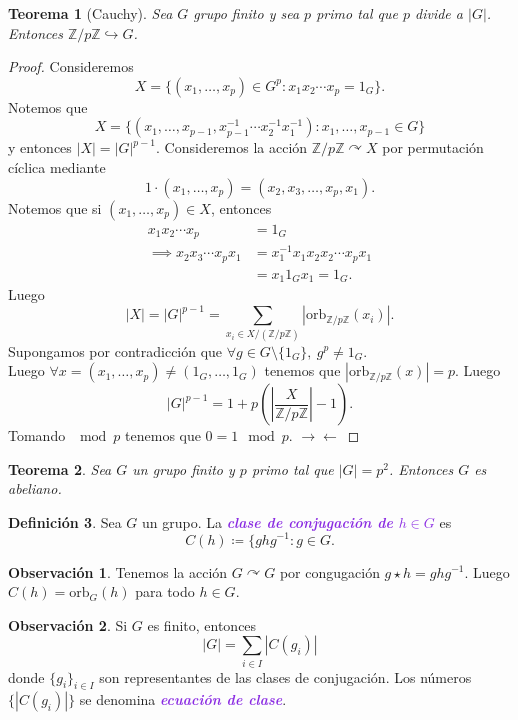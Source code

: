 \documentclass{article}
\newtheorem{theorem}{Teorema}[subsection]
\theoremstyle{definition}
\newtheorem{definition}[theorem]{Definición}
\newtheorem*{obs}{Observación}
\theoremstyle{remark}
\numberwithin{equation}{section}
\newcommand{\Z}{\mathbb{Z}}
\newcommand{\embed}{\hookrightarrow}
\newcommand{\acts}{\curvearrowright}
\renewcommand{\c}{\cdot}
\newcommand{\orb}{\mathrm{orb}}
\newcommand{\abs}[1]{\left| #1 \right|}
\newcommand{\br}[1]{\left( #1 \right)}
\newcommand{\zmz}[1]{\Z/ #1 \Z}
\newcommand{\wea}[1]{\textcolor{BlueViolet}{\textbf{\emph{#1}}}}
\begin{document}
\begin{theorem}
  [Cauchy]
  Sea $G$ grupo finito y sea $p$ primo tal que $p$ divide a $\abs G$. Entonces $\zmz p \embed G$.
\end{theorem}
\begin{proof}
  Consideremos $$X = \{(x_1,\dots,x_p) \in G^p : x_1 x_2 \cdots x_p = 1_G\}.$$
  Notemos que $$X = \{(x_1,\dots,x_{p-1}, x_{p-1}^{-1}\cdots x_2^{-1}x_1^{-1}) : x_1,\dots,x_{p-1} \in G\}$$ y entonces $\abs X = \abs G^{p-1}$.
  Consideremos la acción $\zmz p \acts X$ por permutación cíclica mediante $$1 \c (x_1,\dots,x_p) = (x_2,x_3, \dots, x_p, x_1).$$
  Notemos que si $(x_1,\dots,x_p) \in X$, entonces
  \begin{align*}
    x_1 x_2 \cdots x_p &= 1_G \\
    \implies x_2 x_3 \cdots x_p x_1 &= x_1^{-1} x_1 x_2 x_2 \cdots x_p x_1 \\
    &= x_1 1_G x_1 = 1_G.
  \end{align*}
  Luego
  \[\abs{X} = \abs{G}^{p-1} = \sum_{x_i \in X/(\Z/p\Z)} |\orb_{\Z/p\Z} (x_i)|.\]
  Supongamos por contradicción que $\forall g \in G \setminus \{1_G\}, \ g^p \neq 1_G$. \\
  Luego $\forall x = (x_1,\dots,x_p) \neq (1_G,\dots,1_G)$ tenemos que $\abs{\orb_{\zmz p}(x)} = p$. Luego
  \[\abs G^{p-1} = 1 + p \br{\abs{\frac{X}{\zmz p}} -1}.\]
  Tomando $\mod p$ tenemos que $0=1 \mod p$. $\to\gets$
\end{proof}

\begin{theorem}
  Sea $G$ un grupo finito y $p$ primo tal que $\abs G = p^2$. Entonces $G$ es abeliano.
\end{theorem}

\begin{definition}
  Sea $G$ un grupo. La \wea{clase de conjugación de $h \in G$} es
  \[C(h) \coloneqq \{ghg^{-1} : g \in G.\]
\end{definition}

\begin{obs}
  Tenemos la acción $G \acts G$ por congugación $g \star h = ghg^{-1}$. Luego $C(h) = \orb_G(h)$ para todo $h \in G$.
\end{obs}

\begin{obs}
  Si $G$ es finito, entonces $$\abs G = \sum_{i \in I} \abs{C(g_i)}$$ donde $\{g_i\}_{i \in I}$ son representantes de las clases de conjugación. Los números $\{\abs{C(g_i)}\}$ se denomina \wea{ecuación de clase}.
\end{obs}
\end{document}
